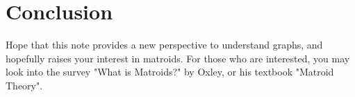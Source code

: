\documentclass[a4paper,10pt]{article}
\begin{document}
\section*{Conclusion}

Hope that this note provides a new perspective to understand graphs, and hopefully raises your interest in matroids. For those who are interested, you may look into the survey "What is Matroids?" by Oxley, or his textbook "Matroid Theory".

%
%
%  
%  
%  
%  
%  
%  
%  
%  
%  
\end{document}
